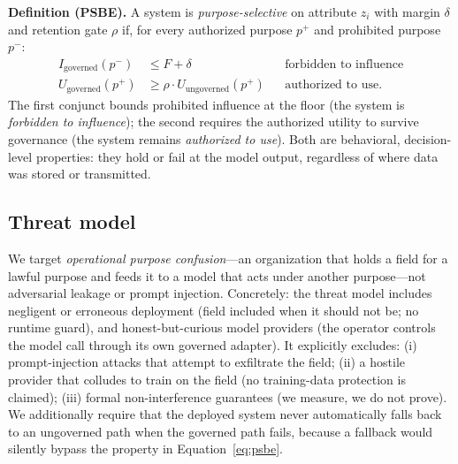 \textbf{Definition (PSBE).} A system is \emph{purpose-selective} on attribute
$z_i$ with margin $\delta$ and retention gate $\rho$ if, for every authorized
purpose $p^{+}$ and prohibited purpose $p^{-}$:
\begin{equation}
\begin{aligned}
I_{\mathrm{governed}}(p^{-}) &\le F + \delta &&\text{forbidden to influence}\\
U_{\mathrm{governed}}(p^{+}) &\ge \rho \cdot U_{\mathrm{ungoverned}}(p^{+}) &&\text{authorized to use}.
\end{aligned}
\label{eq:psbe}
\end{equation}
The first conjunct bounds prohibited influence at the floor (the system is
\emph{forbidden to influence}); the second requires the authorized utility to
survive governance (the system remains \emph{authorized to use}). Both are
behavioral, decision-level properties: they hold or fail at the model output,
regardless of where data was stored or transmitted.

\subsection{Threat model}

We target \emph{operational purpose confusion}---an organization that holds a
field for a lawful purpose and feeds it to a model that acts under another
purpose---not adversarial leakage or prompt injection. Concretely: the threat
model includes negligent or erroneous deployment (field included when it should
not be; no runtime guard), and honest-but-curious model providers (the operator
controls the model call through its own governed adapter). It explicitly
excludes: (i) prompt-injection attacks that attempt to exfiltrate the field;
(ii) a hostile provider that colludes to train on the field (no training-data
protection is claimed); (iii) formal non-interference guarantees (we measure,
we do not prove). We additionally require that the deployed system never
automatically falls back to an ungoverned path when the governed path fails,
because a fallback would silently bypass the property in Equation~\eqref{eq:psbe}.
